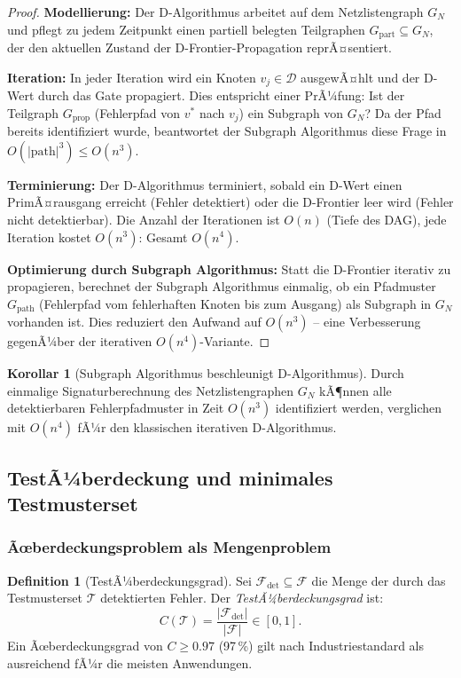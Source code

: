 ﻿\documentclass[a4paper,12pt]{article}
\theoremstyle{definition}
\newtheorem{definition}{Definition}
\newtheorem{korollar}{Korollar}
\begin{document}
\begin{proof}
  \textbf{Modellierung:} Der D-Algorithmus arbeitet auf dem Netzlistengraph $G_N$ und
  pflegt zu jedem Zeitpunkt einen partiell belegten Teilgraphen $G_{\text{part}}
  \subseteq G_N$, der den aktuellen Zustand der D-Frontier-Propagation reprÃ¤sentiert.

  \textbf{Iteration:} In jeder Iteration wird ein Knoten $v_j \in \mathcal{D}$
  ausgewÃ¤hlt und der D-Wert durch das Gate propagiert. Dies entspricht einer PrÃ¼fung:
  Ist der Teilgraph $G_{\text{prop}}$ (Fehlerpfad von $v^*$ nach $v_j$) ein Subgraph
  von $G_N$? Da der Pfad bereits identifiziert wurde, beantwortet der Subgraph Algorithmus
  diese Frage in $O(|\text{path}|^3) \leq O(n^3)$.

  \textbf{Terminierung:} Der D-Algorithmus terminiert, sobald ein D-Wert einen
  PrimÃ¤rausgang erreicht (Fehler detektiert) oder die D-Frontier leer wird (Fehler
  nicht detektierbar). Die Anzahl der Iterationen ist $O(n)$ (Tiefe des DAG), jede
  Iteration kostet $O(n^3)$: Gesamt $O(n^4)$.

  \textbf{Optimierung durch Subgraph Algorithmus:} Statt die D-Frontier iterativ zu
  propagieren, berechnet der Subgraph Algorithmus einmalig, ob ein Pfadmuster
  $G_{\text{path}}$ (Fehlerpfad vom fehlerhaften Knoten bis zum Ausgang) als Subgraph
  in $G_N$ vorhanden ist. Dies reduziert den Aufwand auf $O(n^3)$ -- eine Verbesserung
  gegenÃ¼ber der iterativen $O(n^4)$-Variante.
\end{proof}

\begin{korollar}[Subgraph Algorithmus beschleunigt D-Algorithmus]\label{kor:datpg}
  Durch einmalige Signaturberechnung des Netzlistengraphen $G_N$ kÃ¶nnen alle
  detektierbaren Fehlerpfadmuster in Zeit $O(n^3)$ identifiziert werden, verglichen
  mit $O(n^4)$ fÃ¼r den klassischen iterativen D-Algorithmus.
\end{korollar}

\subsection{TestÃ¼berdeckung und minimales Testmusterset}

\subsubsection{Ãœberdeckungsproblem als Mengenproblem}

\begin{definition}[TestÃ¼berdeckungsgrad]\label{def:testcover}
  Sei $\mathcal{F}_{\text{det}} \subseteq \mathcal{F}$ die Menge der durch das
  Testmusterset $\mathcal{T}$ detektierten Fehler. Der \emph{TestÃ¼berdeckungsgrad} ist:
  \[
    C(\mathcal{T}) = \frac{|\mathcal{F}_{\text{det}}|}{|\mathcal{F}|} \in [0, 1].
  \]
  Ein Ãœberdeckungsgrad von $C \geq 0.97$ (97\,\%) gilt nach Industriestandard
  als ausreichend fÃ¼r die meisten Anwendungen.
\end{definition}
\end{document}
